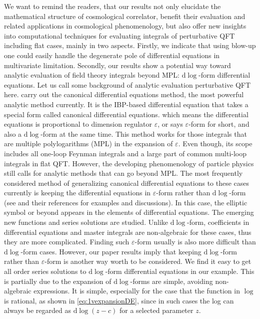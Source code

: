 \documentclass[a4paper,11pt]{article}
\newcommand{\ep}{\varepsilon}
\newcommand{\nd}{\mathrm{d}}
\begin{document}
We want to remind the readers, that our results not only elucidate the mathematical structure of cosmological correlator, benefit their evaluation and related applications in cosmological phenomenology, but also offer new insights into computational techniques for evaluating integrals of perturbative QFT including flat cases, mainly in two aspects. Firstly, we indicate that using blow-up one could easily handle the degenerate pole of differential equations in multivariate limitation. Secondly, our results show a potential way toward analytic evaluation of field theory integrals beyond MPL: $\nd \log$-form differential equations. Let us call some background of analytic evaluation perturbative QFT here. \cite{Henn:2013pwa} carry out the canonical differential equations method, the most powerful analytic method currently. It is the IBP-based differential equation that takes a special form called canonical differential equations. which means the  differential equations is  proportional to dimension regulator $\ep$, or says $\ep$-form for short, and also a $\nd \log$-form at the same time. This method works for those integrals that are multiple polylogarithms (MPL) in the expansion of $\ep$. Even though, its scope includes all one-loop Feynman integrals and a large part of common multi-loop integrals in flat QFT. However, the developing phenomenology of particle physics still calls for analytic methods that can go beyond MPL. The most frequently considered method of generalizing canonical differential equations to these cases currently is keeping the differential equations in $\ep$-form  rather than $\nd \log$-form (see \cite{Pogel:2022vat,Bogner:2019lfa, Broedel:2018iwv, Adams:2018yfj} and their references for examples and discussions). In this case, the elliptic symbol or beyond appears in the elements of differential equations.  The emerging new functions and series solutions are studied. Unlike  $\nd \log$-form, coefficients in differential equations and master integrals are non-algebraic for these cases, thus they are more complicated. Finding such $\ep$-form usually is also more difficult than $\nd \log$-form cases. However, our paper results imply that keeping $\nd \log$-form  rather than $\ep$-form is another way worth to be considered. We find it easy to get all order series solutions to $\nd \log$-form differential equations in our example. This is partially due to the expansion of $\nd \log$-forms are simple, avoiding non-algebraic expressions. It is simple, especially for the case that the function in $\log$ is rational, as shown in \eqref{eq:1vexpansionDE}, since in such cases the log can always be regarded as $\nd \log(z-c)$ for a selected
 parameter $z$.
\end{document}
